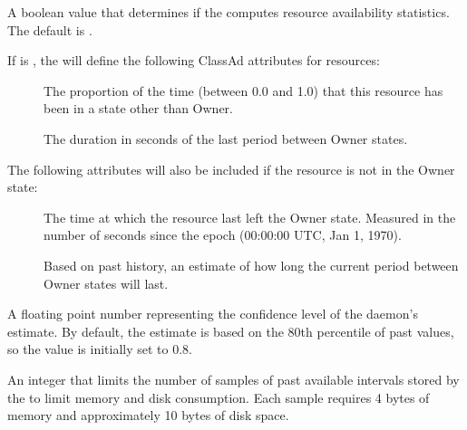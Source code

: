 \begin{description}

\label{param:StartdComputeAvailStats}
\item[\Macro{STARTD\_COMPUTE\_AVAIL\_STATS}]
  A boolean value that determines if the  computes resource
  availability statistics.  The default is .

  If  is , 
  the  will
  define the following ClassAd attributes for resources:

  \begin{description}
  \item[]
    The proportion of the time (between 0.0 and 1.0)
    that this resource has been in a state other than Owner.
  \item[]
    The duration in seconds of the last period between Owner states.
  \end{description}

  The following attributes will also be included if the resource is
  not in the Owner state:

  \begin{description}
  \item[]
    The time at which the resource last left the
    Owner state.  Measured in the number of seconds since the
    epoch (00:00:00 UTC, Jan 1, 1970).
  \item[]
    Based on past history, an estimate
    of how long the current period between Owner states will last.
  \end{description}

\label{param:StartdAvailConfidence}
\item[\Macro{STARTD\_AVAIL\_CONFIDENCE}]
  A floating point number representing the confidence level of the
   daemon's  estimate.
  By default, the estimate is based on
  the 80th percentile of past values, so the value is initially set to 0.8.

\label{param:StartdMaxAvailPeriodSamples}
\item[\Macro{STARTD\_MAX\_AVAIL\_PERIOD\_SAMPLES}]
  An integer that limits the number of samples of past available
  intervals stored by the  to limit memory and disk consumption.
  Each sample requires 4 bytes of memory and approximately 10 bytes of
  disk space.


\end{description}
